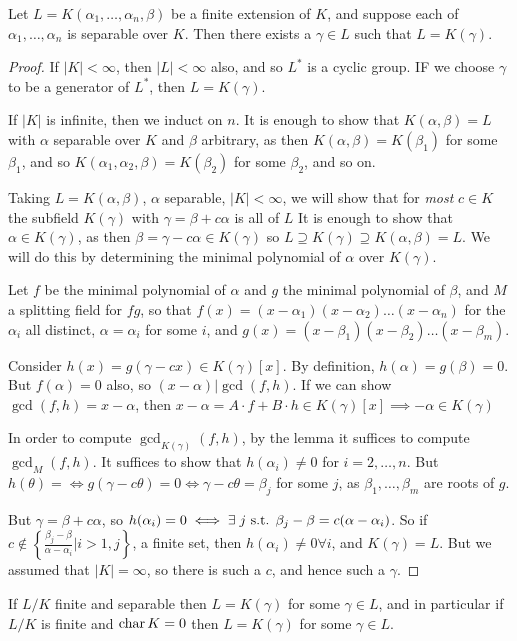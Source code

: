 \documentclass[10pt,a4paper]{article}
\begin{document}
\begin{theorem}
Let $L = K(\alpha_1, \ldots, \alpha_n, \beta)$ be a finite extension of $K$, and suppose each of $\alpha_1, \ldots, \alpha_n$ is separable over $K$. Then there exists a $\gamma \in L$ such that $L = K(\gamma)$.
\end{theorem}
\begin{proof}
If $|K| < \infty$, then $|L|<\infty$ also, and so $L^\ast$ is a cyclic group. IF we choose $\gamma$ to be a generator of $L^\ast$, then $L=K(\gamma)$.

If $|K|$ is infinite, then we induct on $n$. It is enough to show that $K(\alpha, \beta) = L$ with $\alpha$ separable over $K$ and $\beta$ arbitrary, as then $K(\alpha, \beta) = K(\beta_1)$ for some $\beta_1$, and so $K(\alpha_1, \alpha_2, \beta) = K(\beta_2)$ for some $\beta_2$, and so on.

Taking $L=K(\alpha, \beta)$, $\alpha$ separable, $|K|<\infty$, we will show that for \textit{most} $c\in K$ the subfield $K(\gamma)$ with $\gamma = \beta+c\alpha$ is all of $L$ It is enough to show that $\alpha \in K(\gamma)$, as then $\beta = \gamma-c\alpha \in K(\gamma)$ so $L \supseteq K(\gamma) \supseteq K(\alpha, \beta) = L$. We will do this by determining the minimal polynomial of $\alpha$ over $K(\gamma)$.

Let $f$ be the minimal polynomial of $\alpha$ and $g$ the minimal polynomial of $\beta$, and $M$ a splitting field for $fg$, so that $f(x) = (x-\alpha_1)(x-\alpha_2)\ldots(x-\alpha_n)$ for the $\alpha_i$ all distinct, $\alpha = \alpha_i$ for some $i$, and $g(x) = (x-\beta_1)(x-\beta_2)\ldots(x-\beta_m)$.

Consider $h(x) = g(\gamma-cx) \in K(\gamma)[x]$. By definition, $h(\alpha) = g(\beta) = 0$. But $f(\alpha) = 0$ also, so $(x-\alpha)|\gcd(f,h)$. If we can show $\gcd(f,h) = x-\alpha$, then $x-\alpha = A\cdot f + B\cdot h \in K(\gamma)[x] \implies -\alpha \in K(\gamma)$ 

In order to compute $\gcd_{K(\gamma)} (f,h)$, by the lemma it suffices to compute $\gcd_M(f,h)$. It suffices to show that $h(\alpha_i) \neq 0$ for $i=2, \ldots, n$. But $h(\theta) =  \iff g(\gamma-c\theta)=0 \iff \gamma-c\theta = \beta_j$ for some $j$, as $\beta_1, \ldots, \beta_m$ are roots of $g$.

But $\gamma = \beta+c\alpha$, so $h(\alpha_i) = 0 \iff \exists j \st \beta_j-\beta = c(\alpha-\alpha_i)$. So if $c\notin \left\{\frac{\beta_j-\beta}{\alpha-\alpha_i}|i>1, j\right\}$, a finite set, then $h(\alpha_i)\neq 0\forall i$, and $K(\gamma)=L$. But we assumed that $|K|=\infty$, so there is such a $c$, and hence such a $\gamma$.
\end{proof}
\begin{corollary}
If $L/K$ finite and separable then $L=K(\gamma)$ for some $\gamma \in L$, and in particular if $L/K$ is finite and $\operatorname{char} K = 0$ then $L=K(\gamma)$ for some $\gamma \in L$.
\end{corollary}
\end{document}
